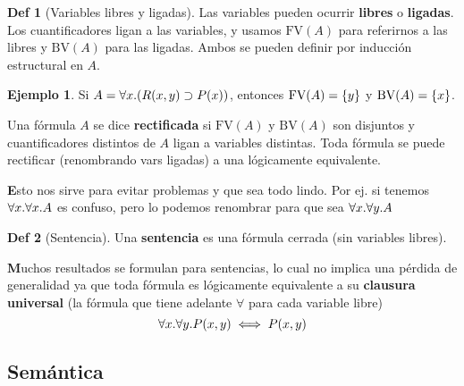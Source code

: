 \documentclass{report}
\theoremstyle{definition} %
\newtheorem*{definition*}{Def}
\newtheorem*{example*}{Ejemplo}
\newenvironment{nota}[1]
    {\begin{leftbar}\textbf{#1}}
    {\end{leftbar}}
\newcommand{\fv}[1]{\text{FV}(#1)} %
\newcommand{\bv}[1]{\text{BV}(#1)} %
\begin{document}
\begin{definition*}[Variables libres y ligadas]
    Las variables pueden ocurrir \textbf{libres} o \textbf{ligadas}. Los
    cuantificadores ligan a las variables, y usamos $\fv{A}$ para referirnos a
    las libres y $\bv{A}$ para las ligadas. Ambos se pueden definir por
    inducción estructural en $A$.
    \begin{example*}
        Si $A = \forall x . (R(x, y) \supset P(x))$, entonces $\fv{A} =
        \set{y}$ y $\bv{A} = \set{x}$.
    \end{example*}

    Una fórmula $A$ se dice \textbf{rectificada} si $\fv{A}$ y $\bv{A}$ son
    disjuntos y cuantificadores distintos de $A$ ligan a variables distintas.
    Toda fórmula se puede rectificar (renombrando vars ligadas) a una
    lógicamente equivalente.
    
    \begin{nota}
        Esto nos sirve para evitar problemas y que sea todo lindo. Por ej. si
        tenemos $\forall x . \forall x . A$ es confuso, pero lo podemos
        renombrar para que sea $\forall x . \forall y . A$
    \end{nota}
\end{definition*}

\begin{definition*}[Sentencia]
    Una \textbf{sentencia} es una fórmula cerrada (sin variables libres).

    \begin{nota}
        Muchos resultados se formulan para sentencias, lo cual no implica una
        pérdida de generalidad ya que toda fórmula es lógicamente equivalente a
        su \textbf{clausura universal} (la fórmula que tiene adelante $\forall$
        para cada variable libre)
        \[
            \forall x . \forall y . P(x, y) \iff P(x, y)
        \]
    \end{nota}
\end{definition*}

\subsection{Semántica}
\end{document}
